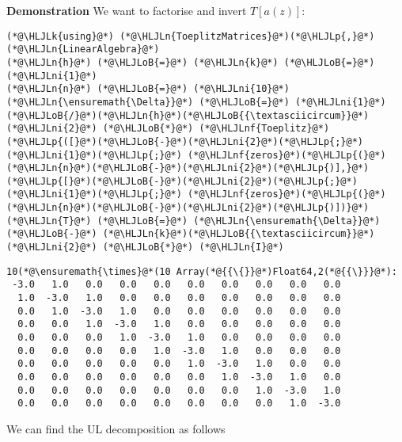 \documentclass[12pt,a4paper]{article}
\newcommand{\HLJLk}[1]{\textcolor[RGB]{148,91,176}{\textbf{#1}}}
\newcommand{\HLJLn}[1]{#1}
\newcommand{\HLJLnf}[1]{\textcolor[RGB]{66,102,213}{#1}}
\newcommand{\HLJLni}[1]{\textcolor[RGB]{59,151,46}{#1}}
\newcommand{\HLJLoB}[1]{\textcolor[RGB]{102,102,102}{\textbf{#1}}}
\newcommand{\HLJLp}[1]{#1}
\begin{document}
\textbf{Demonstration} We want to factorise and invert $T[a(z)]$:


\begin{lstlisting}
(*@\HLJLk{using}@*) (*@\HLJLn{ToeplitzMatrices}@*)(*@\HLJLp{,}@*) (*@\HLJLn{LinearAlgebra}@*)
(*@\HLJLn{h}@*) (*@\HLJLoB{=}@*) (*@\HLJLn{k}@*) (*@\HLJLoB{=}@*) (*@\HLJLni{1}@*)
(*@\HLJLn{n}@*) (*@\HLJLoB{=}@*) (*@\HLJLni{10}@*)
(*@\HLJLn{\ensuremath{\Delta}}@*) (*@\HLJLoB{=}@*) (*@\HLJLni{1}@*)(*@\HLJLoB{/}@*)(*@\HLJLn{h}@*)(*@\HLJLoB{{\textasciicircum}}@*)(*@\HLJLni{2}@*) (*@\HLJLoB{*}@*) (*@\HLJLnf{Toeplitz}@*)(*@\HLJLp{([}@*)(*@\HLJLoB{-}@*)(*@\HLJLni{2}@*)(*@\HLJLp{;}@*) (*@\HLJLni{1}@*)(*@\HLJLp{;}@*) (*@\HLJLnf{zeros}@*)(*@\HLJLp{(}@*)(*@\HLJLn{n}@*)(*@\HLJLoB{-}@*)(*@\HLJLni{2}@*)(*@\HLJLp{)],}@*) (*@\HLJLp{[}@*)(*@\HLJLoB{-}@*)(*@\HLJLni{2}@*)(*@\HLJLp{;}@*) (*@\HLJLni{1}@*)(*@\HLJLp{;}@*) (*@\HLJLnf{zeros}@*)(*@\HLJLp{(}@*)(*@\HLJLn{n}@*)(*@\HLJLoB{-}@*)(*@\HLJLni{2}@*)(*@\HLJLp{)])}@*)
(*@\HLJLn{T}@*) (*@\HLJLoB{=}@*) (*@\HLJLn{\ensuremath{\Delta}}@*) (*@\HLJLoB{-}@*) (*@\HLJLn{k}@*)(*@\HLJLoB{{\textasciicircum}}@*)(*@\HLJLni{2}@*) (*@\HLJLoB{*}@*) (*@\HLJLn{I}@*)
\end{lstlisting}

\begin{lstlisting}
10(*@\ensuremath{\times}@*(10 Array(*@{{\{}}@*)Float64,2(*@{{\}}}@*):
 -3.0   1.0   0.0   0.0   0.0   0.0   0.0   0.0   0.0   0.0
  1.0  -3.0   1.0   0.0   0.0   0.0   0.0   0.0   0.0   0.0
  0.0   1.0  -3.0   1.0   0.0   0.0   0.0   0.0   0.0   0.0
  0.0   0.0   1.0  -3.0   1.0   0.0   0.0   0.0   0.0   0.0
  0.0   0.0   0.0   1.0  -3.0   1.0   0.0   0.0   0.0   0.0
  0.0   0.0   0.0   0.0   1.0  -3.0   1.0   0.0   0.0   0.0
  0.0   0.0   0.0   0.0   0.0   1.0  -3.0   1.0   0.0   0.0
  0.0   0.0   0.0   0.0   0.0   0.0   1.0  -3.0   1.0   0.0
  0.0   0.0   0.0   0.0   0.0   0.0   0.0   1.0  -3.0   1.0
  0.0   0.0   0.0   0.0   0.0   0.0   0.0   0.0   1.0  -3.0
\end{lstlisting}


We can find the UL decomposition as follows
\end{document}
